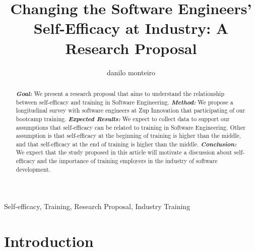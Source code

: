 \documentclass[10pt, conference]{IEEEtran}
\author{danilo monteiro}
\begin{document}
\title{Changing the Software Engineers' Self-Efficacy at Industry: A Research Proposal}


\author{
\and
{}
\and
{}

}

\maketitle

\begin{abstract}
\textbf{\textit{Goal: }}We present a research proposal that aims to understand the relationship between self-efficacy and training in Software Engineering. \textbf{\textit{Method:}} We propose a longitudinal survey with software engineers at Zup Innovation that participating of our bootcamp training. \textbf{\textit{Expected Results:}} We expect to collect data to support our assumptions that self-efficacy can be related to training in Software Engineering. Other assumption is that self-efficacy at the beginning of training is higher than the middle, and that self-efficacy at the end of training is higher than the middle. \textbf{\textit{Conclusion:}} We expect that the study proposed in this article will motivate a discussion about self-efficacy and the importance of training employers in the industry of software development.
\end{abstract}

\begin{IEEEkeywords}
Self-efficacy, Training, Research Proposal, Industry Training
\end{IEEEkeywords}

\section{Introduction}
\end{document}
